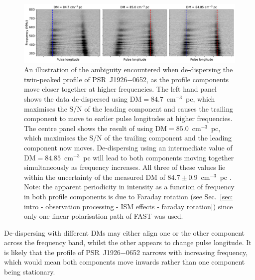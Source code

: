 \begin{figure}
    \begin{center}
        \includegraphics[width=1.0\textwidth]{Figures/J1926/dedispersion_real_data}
        \caption[Ambiguity in de-dispersion of a multi-component pulse profile]{An illustration of the ambiguity encountered when de-dispersing the twin-peaked profile of PSR~J1926$-$0652, as the profile components move closer together at higher frequencies. The left hand panel shows the data de-dispersed using DM$=84.7$~cm$^{-3}$~pc, which maximises the S/N of the leading component and causes the trailing component to move to earlier pulse longitudes at higher frequencies. The centre panel shows the result of using  DM$=85.0$~cm$^{-3}$~pc, which maximises the S/N of the trailing component and the leading component now moves. De-dispersing using an intermediate value of DM$=84.85$~cm$^{-3}$~pc will lead to both components moving together simultaneously as frequency increases. All three of these values lie within the uncertainty of the measured DM of $84.7 \pm 0.9$~cm$^{-3}$~pc \citep{ZLH+2019}. Note: the apparent periodicity in intensity as a function of frequency in both profile components is due to Faraday rotation (see Sec.~\ref{sec: intro - observation processing - ISM effects - faraday rotation}) since only one linear polarisation path of FAST was used.}
        \label{fig: J1926 - dedispersion}
    \end{center}
\end{figure}
De-dispersing with different DMs may either align one or the other component across the frequency band, whilst the other appears to change pulse longitude. It is likely that the profile of PSR~J1926$-$0652 narrows with increasing frequency, which would mean both components move inwards rather than one component being stationary.

